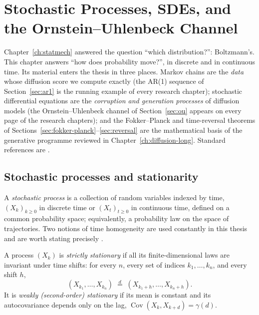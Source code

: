 \chapter{Stochastic Processes, SDEs, and the Ornstein--Uhlenbeck Channel}
\label{ch:stochproc}\label{ch:sde}

Chapter~\ref{ch:statmech} answered the question ``which distribution?'':
Boltzmann's. This chapter answers ``how does probability move?'', in
discrete and in continuous time. Its material enters the thesis in
three places. Markov chains are the \emph{data} whose diffusion score
we compute exactly (the AR(1) sequence of Section~\ref{sec:ar1} is the
running example of every research chapter); stochastic differential
equations are the \emph{corruption and generation processes} of diffusion
models (the Ornstein--Uhlenbeck channel of Section~\ref{sec:ou} appears
on every page of the research chapters); and the Fokker--Planck and
time-reversal theorems of
Sections~\ref{sec:fokker-planck}--\ref{sec:reversal} are the
mathematical basis of the generative programme reviewed in
Chapter~\ref{ch:diffusion-long}. Standard references are
\citet{robert2004monte, brockwell1991time, oksendal2003stochastic,
gardiner2009stochastic, risken1989}.

\section{Stochastic processes and stationarity}\label{sec:stationarity}

A \emph{stochastic process} is a collection of random variables indexed
by time, $(X_k)_{k \geq 0}$ in discrete time or $(X_t)_{t \geq 0}$ in
continuous time, defined on a common probability space; equivalently, a
probability law on the space of trajectories. Two notions of time
homogeneity are used constantly in this thesis and are worth stating
precisely \citep{brockwell1991time}.

\begin{definition}\label{def:stationarity}
A process $(X_k)$ is \emph{strictly stationary} if all its
finite-dimensional laws are invariant under time shifts: for every $n$,
every set of indices $k_1, \dots, k_n$, and every shift $h$,
\begin{equation*}
  (X_{k_1}, \dots, X_{k_n})
  \;\stackrel{d}{=}\;
  (X_{k_1 + h}, \dots, X_{k_n + h}) .
\end{equation*}
It is \emph{weakly (second-order) stationary} if its mean is constant and
its autocovariance depends only on the lag,
$\operatorname{Cov}(X_k, X_{k+d}) = \gamma(d)$.
\end{definition}


